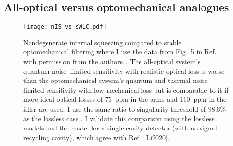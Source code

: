 \subsection{All-optical versus optomechanical analogues}
\label{sec:nIS_vs_sWLC}

\begin{figure}
	\centering
	\texttt{[image: nIS\_vs\_sWLC.pdf]}
	\caption{ Nondegenerate internal squeezing compared to stable optomechanical filtering where I use the data from Fig.~5 in Ref.~\cite{Li2020} with permission from the authors~\cite{personalCorrespondence}. The all-optical system's quantum noise--limited sensitivity with realistic optical loss is worse than the optomechanical system's quantum and thermal noise--limited sensitivity with low mechanical loss but is comparable to it if more ideal optical losses of 75~ppm in the arms and 100~ppm in the idler are used. I use the same ratio to singularity threshold of $98.6\%$ as the lossless case . I validate this comparison using the lossless models and the model for a single-cavity detector (with no signal-recycling cavity), which agree with Ref.~\ref{Li2020}.}
	\label{fig:nIS_vs_sWLC}
\end{figure}

